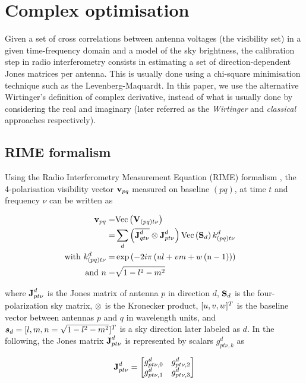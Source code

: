 \section{Complex optimisation}
\label{sec:Wirtinger}

Given a set of cross correlations between antenna voltages (the
visibility set) in a given time-frequency domain and a model of the sky brightness, the calibration
step in radio interferometry consists in estimating a set of
direction-dependent Jones matrices per antenna. This is usually done
using a chi-square minimisation technique such as the
Levenberg-Maquardt. In this paper, we use the alternative Wirtinger's
definition of complex derivative, instead of what is usually done by
considering the real and imaginary (later referred as the
{\it Wirtinger} and {\it classical} approaches respectively).

\subsection{RIME formalism}

Using the Radio Interferometry Measurement Equation (RIME) formalism
\citep[][]{Hamaker96}, the
4-polarisation visibility vector $\textbf{v}_{pq}$ measured on baseline $(pq)$,
at time $t$ and frequency $\nu$ can be written as


\begin{alignat}{2}
\label{eq:ME}
\textbf{v}_{pq}=&\text{Vec}\left(\textbf{V}_{(pq)t\nu}\right)&\\
=&\displaystyle\sum\limits_{d} \left(\overline{\textbf{J}^{d}_{qt\nu}}\otimes \textbf{J}^{d}_{pt\nu}\right)
\text{Vec}\left(\textbf{S}_d\right) k^{d}_{(pq)t\nu}\\
\text{with}\ k^{d}_{(pq)t\nu}=&\exp{\left(-2 i\pi
  \left(ul+vm+w\left(\text{n}-1\right)\right)\right)}\\
\text{and}\ n=&\sqrt{1-l^2-m^2}
\end{alignat}

\noindent where $\textbf{J}^{d}_{pt\nu}$ is the Jones matrix of antenna $p$
in direction $d$, $\textbf{S}_d$ is the four-polarization sky matrix, $\otimes$
is the Kronecker product, $[u,v,w]^T$ is the baseline vector between antennas
$p$ and $q$ in wavelength units, and
$\vec{s}_d=[\l,\m,\n=\sqrt{1-\l^2-\m^2}]^T$ is a sky direction later
labeled as $d$.
In the following, the Jones matrix $\textbf{J}^{d}_{pt\nu}$ is
represented by scalars $g^{d}_{pt\nu,k}$ as

\begin{equation}
\textbf{J}^{d}_{pt\nu}=
\begin{bmatrix}
g^{d}_{pt\nu,0} & g^{d}_{pt\nu,2} \\ 
g^{d}_{pt\nu,1} & g^{d}_{pt\nu,3} 
\end{bmatrix}
\end{equation}


